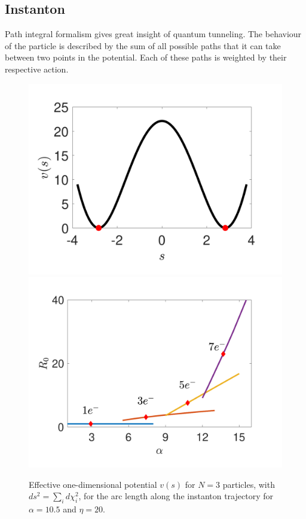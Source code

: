 \documentclass[prb,twocolumn,showpacs,preprintnumbers,amsmath,amssymb, superscriptaddress]{revtex4-2}
\newcommand{\1}{{1\hspace*{-0.5ex} \textrm{l} \hspace*{0.5ex}}}
\begin{document}
\subsection{Instanton}

Path integral formalism gives great insight of quantum tunneling. The behaviour of the particle is described by the sum of all possible paths that it can take between two points in the potential. Each of these paths is weighted by their respective action.

\begin{figure}[h!]
		\begin{center}
			\includegraphics[width=0.9\columnwidth]{SupMatFig_EffectivePotential.pdf}
			\includegraphics[width=0.9\columnwidth]{Fig_perpfactors.pdf}
			
			\label{fig:gap}
			\caption{Effective one-dimensional potential $v(s)$ for $N = 3$ particles, with $ds^2 = \sum_i d\chi_i^2$, for the arc length along the instanton trajectory for $\alpha = 10.5$ and $\eta = 20$.  }
		\end{center}
	\end{figure}
\end{document}
